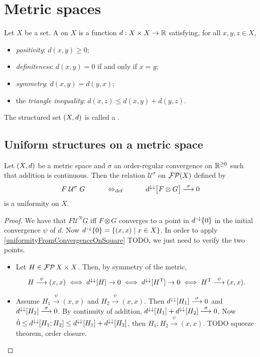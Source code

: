 \section{Metric spaces}
\begin{definition}
Let $X$ be a set. A  on $X$ is a function $d: X\times X\to \mathbb{R}$ satisfying, for all $x,y,z\in X$,
\begin{itemize}
\item \emph{positivity}: $d(x,y) \geq 0$;
\item \emph{definiteness}: $d(x,y) = 0$ \textup{if and only if} $x=y$;
\item \emph{symmetry}: $d(x,y) = d(y,x)$;
\item the \emph{triangle inequality}: $d(x,z) \leq d(x,y) + d(y,z)$.
\end{itemize}
The structured set $\left( X,d \right)$ is called a .
\end{definition}

\subsection{Uniform structures on a metric space}
\begin{proposition} \label{metricUniformities}
Let $\left( X,d \right)$ be a metric space and $\sigma$ an order-regular convergence on $\mathbb{R}^{\geq 0}$ such that addition is continuous. Then the relation $\mathcal{U}^\sigma$ on $\operatorname{\mathcal{FP}}(X)$ defined by
\[ F\mathrel{\mathcal{U}^\sigma}G \qquad\quad\Leftrightarrow_{\text{def}}\quad\qquad d^{\downarrow\downarrow}\big[F\otimes G\big] \overset{\sigma}{\longrightarrow} 0 \]
is a uniformity on $X$.
\end{proposition}
\begin{proof}
We have that $F\mathrel{\mathcal{U}^N}G$ iff $F\otimes G$ converges to a point in $d^{\text{\hspace{0.15em}-}\downarrow}\{0\}$ in the initial convergence $\psi$ of $d$. Now $d^{\text{\hspace{0.15em}-}\downarrow}\{0\} = \left\{ (x,x) \;\middle|\; x\in X \right\}$. In order to apply \ref{uniformityFromConvergenceOnSquare} TODO, we just need to verify the two points. 
\begin{itemize}
\item Let $H\in \operatorname{\mathcal{FP}}{X\times X}$. Then, by symmetry of the metric,
\[ H\overset{\psi}{\longrightarrow} (x,x) \iff d^{\downarrow\downarrow}[H] \to 0 \iff d^{\downarrow\downarrow}[H^{\mathrm{T}}] \to 0 \iff H^{\mathrm{T}}\overset{\psi}{\longrightarrow} (x,x). \]
\item Assume $H_1\overset{\psi}{\longrightarrow} (x,x)$ and $H_2\overset{\psi}{\longrightarrow} (x,x)$. Then $d^{\downarrow\downarrow}[H_1] \overset{\sigma}{\longrightarrow} 0$ and $d^{\downarrow\downarrow}[H_2] \overset{\sigma}{\longrightarrow} 0$. By continuity of addition, $d^{\downarrow\downarrow}[H_1]+d^{\downarrow\downarrow}[H_2] \overset{\sigma}{\longrightarrow} 0$. Now $\dot{0} \leq d^{\downarrow\downarrow}[H_1;H_2] \leq d^{\downarrow\downarrow}[H_1]+d^{\downarrow\downarrow}[H_2]$, then $H_1;H_2 \overset{\psi}{\longrightarrow} (x, x)$. TODO squeeze theorem, order closure.
\end{itemize}
\end{proof}

